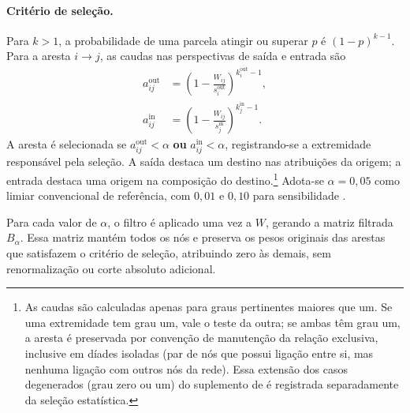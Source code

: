 \paragraph{Critério de seleção.}
Para $k>1$, a probabilidade de uma parcela atingir ou superar $p$ é $(1-p)^{k-1}$. Para a aresta $i\rightarrow j$, as caudas nas perspectivas de saída e entrada são
\begin{equation}
\begin{aligned}
a_{ij}^{\mathrm{out}}&=\left(1-\frac{W_{ij}}{s_i^{\mathrm{out}}}\right)^{k_i^{\mathrm{out}}-1},\\
a_{ij}^{\mathrm{in}}&=\left(1-\frac{W_{ij}}{s_j^{\mathrm{in}}}\right)^{k_j^{\mathrm{in}}-1}.
\end{aligned}
\label{eq:caudas-filtro}
\end{equation}
A aresta é selecionada se $a_{ij}^{\mathrm{out}}<\alpha$ \textbf{ou} $a_{ij}^{\mathrm{in}}<\alpha$, registrando-se a extremidade responsável pela seleção. A saída destaca um destino nas atribuições da origem; a entrada destaca uma origem na composição do destino.\footnote{As caudas são calculadas apenas para graus pertinentes maiores que um. Se uma extremidade tem grau um, vale o teste da outra; se ambas têm grau um, a aresta é preservada por convenção de manutenção da relação exclusiva, inclusive em díades isoladas (par de nós que possui ligação entre si, mas nenhuma ligação com outros nós da rede). Essa extensão dos casos degenerados (grau zero ou um) do suplemento de \textcite{serrano2009} é registrada separadamente da seleção estatística.} Adota-se $\alpha=0{,}05$ como limiar convencional de referência, com $0{,}01$ e $0{,}10$ para sensibilidade \parencite{serrano2009}. 

Para cada valor de $\alpha$, o filtro é aplicado uma vez a $W$, gerando a matriz filtrada $B_\alpha$. Essa matriz mantém todos os nós e preserva os pesos originais das arestas que satisfazem o critério de seleção, atribuindo zero às demais, sem renormalização ou corte absoluto adicional.

